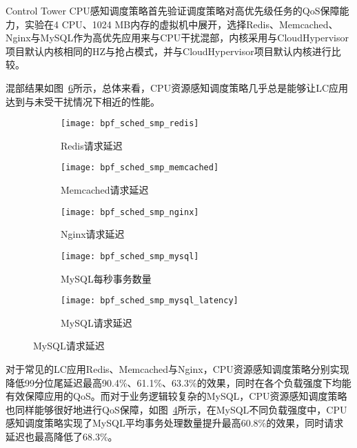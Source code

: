 
Control Tower CPU感知调度策略首先验证调度策略对高优先级任务的QoS保障能力，实验在4 CPU、1024 MB内存的虚拟机中展开，选择Redis、Memcached、Nginx与MySQL作为高优先应用来与CPU干扰混部，内核采用与CloudHypervisor项目默认内核相同的HZ与抢占模式，并与CloudHypervisor项目默认内核进行比较。

混部结果如图~\ref{fig:lc_bpf_sched}所示，总体来看，CPU资源感知调度策略几乎总是能够让LC应用达到与未受干扰情况下相近的性能。

\begin{figure}[H]
    \centering
    \begin{subfigure}[b]{0.32\textwidth}
        \texttt{[image: bpf\_sched\_smp\_redis]}
        \caption{\quad Redis请求延迟}
        \label{fig:bpf_sched_smp_redis}
    \end{subfigure}
    \begin{subfigure}[b]{0.32\textwidth}
        \texttt{[image: bpf\_sched\_smp\_memcached]}
        \caption{\quad Memcached请求延迟}
        \label{fig:bpf_sched_smp_memcached}
    \end{subfigure}
    \begin{subfigure}[b]{0.32\textwidth}
        \texttt{[image: bpf\_sched\_smp\_nginx]}
        \caption{\quad Nginx请求延迟}
        \label{fig:bpf_sched_smp_nginx}
    \end{subfigure}
    \begin{subfigure}[b]{0.32\textwidth}
        \texttt{[image: bpf\_sched\_smp\_mysql]}
        \caption{\quad MySQL每秒事务数量}
        \label{fig:bpf_sched_smp_mysql}
    \end{subfigure}
    \begin{subfigure}[b]{0.32\textwidth}
        \texttt{[image: bpf\_sched\_smp\_mysql\_latency]}
        \caption{\quad MySQL请求延迟} 
        \label{fig:bpf_sched_smp_mysql_latency}
    \end{subfigure}

\label{fig:lc_bpf_sched}
\end{figure}

对于常见的LC应用Redis、Memcached与Nginx，CPU资源感知调度策略分别实现降低99分位尾延迟最高90.4\%、61.1\%、63.3\%的效果，同时在各个负载强度下均能有效保障应用的QoS。而对于业务逻辑较复杂的MySQL，CPU资源感知调度策略也同样能够很好地进行QoS保障，如图~\ref{fig:bpf_sched_smp_mysql}所示，在MySQL不同负载强度中，CPU感知调度策略实现了MySQL平均事务处理数量提升最高60.8\%的效果，同时请求延迟也最高降低了68.3\%。

